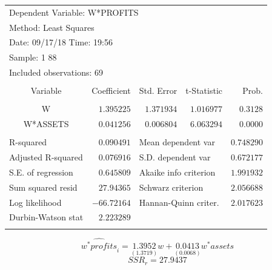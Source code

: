 \documentclass[12pt]{report}
\begin{document}
\begin{table}[H]
	\centering
	\begin{tabular}{lrrrr}
		\multicolumn{4}{l}{Dependent Variable: W*PROFITS}&\multicolumn{1}{c}{}\\
		\multicolumn{3}{l}{Method: Least Squares}&\multicolumn{1}{c}{}&\multicolumn{1}{c}{}\\
		\multicolumn{3}{l}{Date: 09/17/18   Time: 19:56}&\multicolumn{1}{c}{}&\multicolumn{1}{c}{}\\
		\multicolumn{2}{l}{Sample: 1 88}&\multicolumn{1}{c}{}&\multicolumn{1}{c}{}&\multicolumn{1}{c}{}\\
		\multicolumn{3}{l}{Included observations: 69}&\multicolumn{1}{c}{}&\multicolumn{1}{c}{}\\
		[4.5pt] \hline \\ [-4.5pt]
		\multicolumn{1}{c}{Variable}&\multicolumn{1}{r}{Coefficient}&\multicolumn{1}{r}{Std. Error}&\multicolumn{1}{r}{t-Statistic}&\multicolumn{1}{r}{Prob.}\\
		[4.5pt] \hline \\ [-4.5pt]
		\multicolumn{1}{c}{W}&\multicolumn{1}{r}{$1.395225$}&\multicolumn{1}{r}{$1.371934$}&\multicolumn{1}{r}{$1.016977$}&\multicolumn{1}{r}{$0.3128$}\\
		\multicolumn{1}{c}{W*ASSETS}&\multicolumn{1}{r}{$0.041256$}&\multicolumn{1}{r}{$0.006804$}&\multicolumn{1}{r}{$6.063294$}&\multicolumn{1}{r}{$0.0000$}\\
		[4.5pt] \hline \\ [-4.5pt]
		\multicolumn{1}{l}{R-squared}&\multicolumn{1}{r}{$0.090491$}&\multicolumn{2}{l}{Mean dependent var}&\multicolumn{1}{r}{$0.748290$}\\
		\multicolumn{1}{l}{Adjusted R-squared}&\multicolumn{1}{r}{$0.076916$}&\multicolumn{2}{l}{S.D. dependent var}&\multicolumn{1}{r}{$0.672177$}\\
		\multicolumn{1}{l}{S.E. of regression}&\multicolumn{1}{r}{$0.645809$}&\multicolumn{2}{l}{Akaike info criterion}&\multicolumn{1}{r}{$1.991932$}\\
		\multicolumn{1}{l}{Sum squared resid}&\multicolumn{1}{r}{$27.94365$}&\multicolumn{2}{l}{Schwarz criterion}&\multicolumn{1}{r}{$2.056688$}\\
		\multicolumn{1}{l}{Log likelihood}&\multicolumn{1}{r}{$-66.72164$}&\multicolumn{2}{l}{Hannan-Quinn criter.}&\multicolumn{1}{r}{$2.017623$}\\
		\multicolumn{1}{l}{Durbin-Watson stat}&\multicolumn{1}{r}{$2.223289$}&\multicolumn{1}{c}{}&\multicolumn{1}{c}{}&\multicolumn{1}{c}{}\\
		[4.5pt] \hline \\ [-4.5pt]
	\end{tabular}
\end{table}
\vspace{-\baselineskip} $$\widehat{w^*profits}_i = \underset{(1.3719)}{1.3952}w + \underset{(0.0068)}{0.0413}w^*assets$$ $$SSR_r = 27.9437$$
\end{document}
